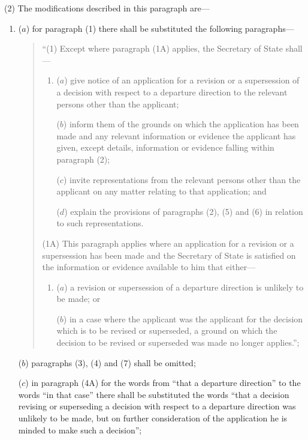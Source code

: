 \documentclass[12pt,a4paper]{article}
\begin{document}
(2) The modifications described in this paragraph are---
\begin{enumerate}\item[]
($a$) for paragraph (1) there shall be substituted the following paragraphs\hspace{0pt}---
\begin{quotation}
“(1) Except where paragraph (1A) applies, the Secretary of State shall---
\begin{enumerate}\item[]
($a$) give notice of an application for a revision or a supersession of a decision with respect to a departure direction to the relevant persons other than the applicant;

($b$) inform them of the grounds on which the application has been made and any relevant information or evidence the applicant has given, except details, information or evidence falling within paragraph (2);

($c$) invite representations from the relevant persons other than the applicant on any matter relating to that application; and

($d$) explain the provisions of paragraphs (2), (5) and (6) in relation to such representations.
\end{enumerate}

(1A) This paragraph applies where an application for a revision or a supersession has been made and the Secretary of State is satisfied on the information or evidence available to him that either---
\begin{enumerate}\item[]
($a$) a revision or supersession of a departure direction is unlikely to be made; or

($b$) in a case where the applicant was the applicant for the decision which is to be revised or superseded, a ground on which the decision to be revised or superseded was made no longer applies.”;
\end{enumerate}
\end{quotation}

($b$) paragraphs (3), (4) and (7) shall be omitted;

($c$) in paragraph (4A) for the words from “that a departure direction” to the words “in that case” there shall be substituted the words “that a decision revising or superseding a decision with respect to a departure direction was unlikely to be made, but on further consideration of the application he is minded to make such a decision”;


\end{enumerate}
\end{document}

